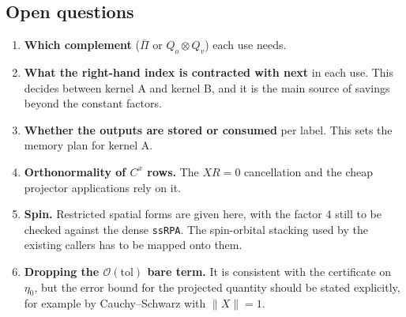 \documentclass[11pt,a4paper]{article}
\newcommand{\code}[1]{\texttt{\small #1}}
\begin{document}
\subsection{Open questions}

\begin{enumerate}
  \item \textbf{Which complement} ($\bar\Pi$ or $Q_o\otimes Q_v$) each use needs.
  \item \textbf{What the right-hand index is contracted with next} in each use. This decides
        between kernel A and kernel B, and it is the main source of savings beyond the constant
        factors.
  \item \textbf{Whether the outputs are stored or consumed} per label. This sets the memory plan
        for kernel A.
  \item \textbf{Orthonormality of $C^x$ rows.} The $XR=0$ cancellation and the cheap projector
        applications rely on it.
  \item \textbf{Spin.} Restricted spatial forms are given here, with the factor 4 still to be
        checked against the dense \code{ssRPA}. The spin-orbital stacking used by the existing
        callers has to be mapped onto them.
  \item \textbf{Dropping the $\mathcal{O}(\mathrm{tol})$ bare term.} It is consistent with the
        certificate on $\eta_0$, but the error bound for the projected quantity should be stated
        explicitly, for example by Cauchy--Schwarz with $\|X\|=1$.
\end{enumerate}
\end{document}

